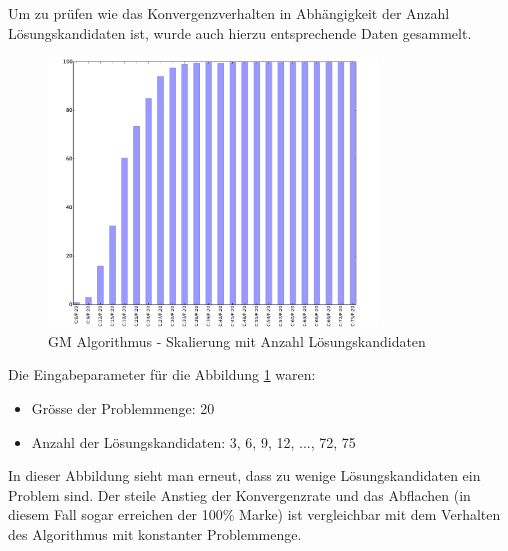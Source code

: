 Um zu prüfen wie das Konvergenzverhalten in Abhängigkeit der Anzahl Lösungskandidaten ist, wurde auch hierzu entsprechende Daten gesammelt.
\begin{figure}[H]
  \centering
  \includegraphics[width=0.78\textwidth]{images/E_G_CS_div5CS_solved.pdf}
  \caption[GM Algorithmus - Skalierung mit Anzahl Lösungskandidaten]{GM Algorithmus - Skalierung mit Anzahl Lösungskandidaten}
  \label{fig:e_g_cs_div5}
\end{figure}
Die Eingabeparameter für die Abbildung \ref{fig:e_g_cs_div5} waren:
\begin{itemize}
	\item Grösse der Problemmenge: 20
	\item Anzahl der Lösungskandidaten: 3, 6, 9, 12, ..., 72, 75
\end{itemize}

In dieser Abbildung sieht man erneut, dass zu wenige Lösungskandidaten ein Problem sind. Der steile Anstieg der Konvergenzrate und das Abflachen (in diesem Fall sogar erreichen der 100\% Marke) ist vergleichbar mit dem Verhalten des Algorithmus mit konstanter Problemmenge.